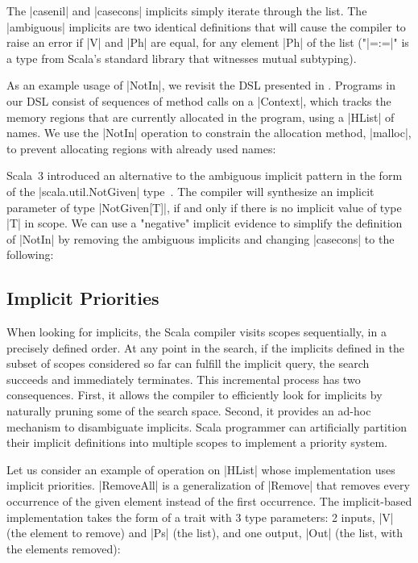 \memImplicitNotIn

\noindent
The |casenil| and |casecons| implicits simply iterate through the list.
The |ambiguous| implicits are two identical definitions that will cause the compiler to raise an error if |V| and |Ph| are equal, for any element |Ph| of the list ("|=:=|" is a type from Scala's standard library that witnesses mutual subtyping).

As an example usage of |NotIn|, we revisit the DSL presented in .
Programs in our DSL consist of sequences of method calls on a |Context|, which tracks the memory regions that are currently allocated in the program, using a |HList| of names.
We use the |NotIn| operation to constrain the allocation method, |malloc|, to prevent allocating regions with already used names:

\memImplicitContextMalloc

Scala~3 introduced an alternative to the ambiguous implicit pattern in the form of the |scala.util.NotGiven| type~\citep[Given Instances]{odersky2013scala}.
The compiler will synthesize an implicit parameter of type |NotGiven[T]|, if and only if there is no implicit value of type |T| in scope.
We can use a "negative" implicit evidence to simplify the definition of |NotIn| by removing the ambiguous implicits and changing |casecons| to the following:

\memImplicitNotGiven

\subsection{Implicit Priorities}

When looking for implicits, the Scala compiler visits scopes sequentially, in a precisely defined order.
At any point in the search, if the implicits defined in the subset of scopes considered so far can fulfill the implicit query, the search succeeds and immediately terminates.
This incremental process has two consequences.
First, it allows the compiler to efficiently look for implicits by naturally pruning some of the search space.
Second, it provides an ad-hoc mechanism to disambiguate implicits.
Scala programmer can artificially partition their implicit definitions into multiple scopes to implement a priority system.

Let us consider an example of operation on |HList| whose implementation uses implicit priorities.
|RemoveAll| is a generalization of |Remove| that removes every occurrence of the given element instead of the first occurrence.
The implicit-based implementation takes the form of a trait with 3 type parameters: 2 inputs, |V| (the element to remove) and |Ps| (the list), and one output, |Out| (the list, with the elements removed):

